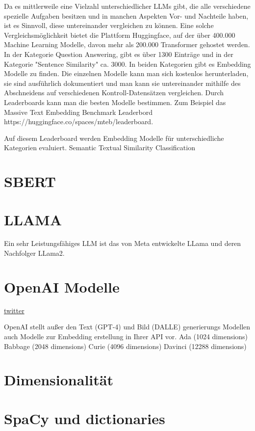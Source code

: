 Da es mittlerweile eine Vielzahl unterschiedlicher LLMs gibt, die alle verschiedene spezielle Aufgaben besitzen und in manchen Aspekten Vor- und Nachteile haben, ist es Sinnvoll, diese untereinander vergleichen zu können.
Eine solche Vergleichsmöglichkeit bietet die Plattform Huggingface, auf der über 400.000 Machine Learning Modelle, davon mehr als 200.000 Transformer gehostet werden.
In der Kategorie Question Answering, gibt es über 1300 Einträge und in der Kategorie "Sentence Similarity" ca. 3000.
In beiden Kategorien gibt es Embedding Modelle zu finden.
Die einzelnen Modelle kann man sich kostenlos herunterladen, sie sind ausführlich dokumentiert und man kann sie untereinander mithilfe des Abschneidens auf verschiedenen Kontroll-Datensätzen vergleichen.
Durch Leaderboards kann man die besten Modelle bestimmen.
Zum Beispiel das Massive Text Embedding Benchmark Leaderbord https://huggingface.co/spaces/mteb/leaderboard.\cite{muennighoff2023}

Auf diesem Leaderboard werden Embedding Modelle für unterschiedliche Kategorien evaluiert.
Semantic Textual Similarity 
Classification




\section{SBERT}

\section{LLAMA}
Ein sehr Leistungsfähiges LLM ist das von Meta entwickelte LLama und deren Nachfolger LLama2. \cite{touvron2023}

\section{OpenAI Modelle}

\href{https://twitter.com/Nils_Reimers/status/1487014195568775173}{twitter}

OpenAI stellt außer den Text (GPT-4) und Bild (DALLE) generierungs Modellen auch Modelle zur Embedding erstellung in Ihrer API vor.
Ada (1024 dimensions)
Babbage (2048 dimensions)
Curie (4096 dimensions)
Davinci (12288 dimensions)

\section{Dimensionalität}

\section{SpaCy und dictionaries}
